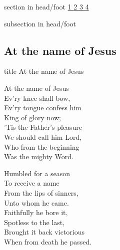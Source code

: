 \documentclass[aspectratio=169]{beamer}
\begin{document}
{
{ 
 {
 \begin{beamercolorbox}[ht=4.5ex,dp=1.5ex,%
      leftskip=.3cm,rightskip=.3cm plus1fil]{section in head/foot}
 \fontsize{12}{25}\selectfont 
\hyperlink{At the name of Jesus[]1}{1  }\hyperlink{At the name of Jesus[]2}{2  }\hyperlink{At the name of Jesus[]3}{3  }\hyperlink{At the name of Jesus[]4}{4  } 
 \end{beamercolorbox}%
  \begin{beamercolorbox}[ht=2.5ex,dp=1.125ex,%
   leftskip=.3cm,rightskip=.3cm plus1fil]{subsection in head/foot}
   \insertauthor
 \end{beamercolorbox}%
 }
}
\subsection{At the name of Jesus}
\hypertarget{At the name of Jesus[]}{}
\begin{frame}{}
 \vfill
  \centering
  \begin{beamercolorbox}[sep=8pt,center,shadow=true,rounded=true]{title}
    At the name of Jesus     
  \end{beamercolorbox}
  \vfill
\end{frame}

\hypertarget{At the name of Jesus[]1}{}
\begin{frame}{}
\fontsize{18.75}{22.5}\selectfont

At the name of Jesus\\ 
Ev'ry knee shall bow,\\ 
Ev'ry tongue confess him\\ 
King of glory now;\\ 
'Tis the Father's pleasure\\ 
We should call him Lord,\\ 
Who from the beginning\\ 
Was the mighty Word.

\end{frame}
\hypertarget{At the name of Jesus[]2}{}
\begin{frame}{}
\fontsize{18.75}{22.5}\selectfont

Humbled for a season\\ 
To receive a name\\ 
From the lips of sinners,\\ 
Unto whom he came.\\ 
Faithfully he bore it,\\ 
Spotless to the last,\\ 
Brought it back victorious\\ 
When from death he passed.


\end{frame}}
\end{document}
